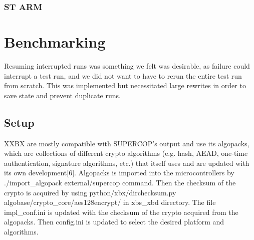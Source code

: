 \documentclass[twoside,11pt]{cergdoc}
\begin{document}
    \subsection{ST ARM}
\chapter{Benchmarking}
Resuming interrupted runs was something we felt was desirable, as failure could
interrupt a test run, and we did not want to have to rerun the entire test run
from scratch. This was implemented but necessitated large rewrites in order to
save state and prevent duplicate runs.

  \section{Setup}
XXBX are mostly compatible with
SUPERCOP’s output and use its algopacks,
which are collections of different crypto
algorithms (e.g. hash, AEAD, one-time
authentication, signature algorithms, etc.)
that itself uses and are updated with its own
development[6]. Algopacks is imported into
the microcontrollers by ./import\_algopack
external/supercop command. Then the
checksum of the crypto is acquired by using
python/xbx/dirchecksum.py
algobase/crypto\_core/aes128encrypt/ in
xbs\_xbd directory. The file impl\_conf.ini is
updated with the checksum of the crypto
acquired from the algopacks. Then
config.ini is updated to select the desired
platform and algorithms.
\end{document}
